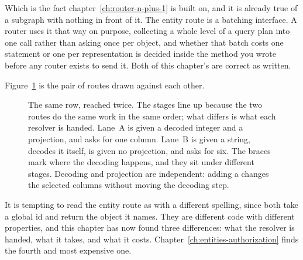 %
Which is the fact chapter~\ref{ch:router-n-plus-1} is built on, and it is
already true of a subgraph with nothing in front of it. The entity route is a
batching interface. A router uses it that way on purpose, collecting a whole
level of a query plan into one call rather than asking once per object, and
whether that batch costs one statement or one per representation is decided
inside the method you wrote before any router exists to send it. Both of this
chapter's are correct as written.

%
Figure~\ref{fig:ch06-two-routes} is the pair of routes drawn against each other.

\begin{figure}
  \centering
  
  \caption{The same row, reached twice. The stages line up because the two
  routes do the same work in the same order; what differs is what each resolver
  is handed. Lane~A is given a decoded integer and a projection, and asks for
  one column. Lane~B is given a string, decodes it itself, is given no
  projection, and asks for six. The braces mark where the decoding happens, and
  they sit under different stages. Decoding and projection are independent:
  adding a  changes the selected columns without moving
  the decoding step.}
  \label{fig:ch06-two-routes}
\end{figure}

%
It is tempting to read the entity route as  with a different
spelling, since both take a global id and return the object it names. They are
different code with different properties, and this chapter has now found three
differences: what the resolver is handed, what it takes, and what it costs.
Chapter~\ref{ch:entities-authorization} finds the fourth and most expensive one.
%
